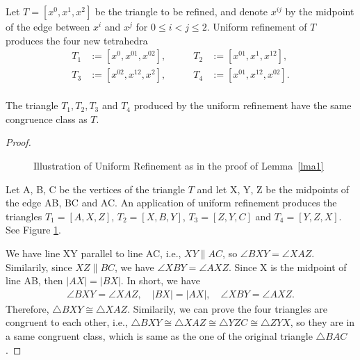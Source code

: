     Let $T = [x^0, x^1, x^2]$ be the triangle to be refined, and denote $x^{ij}$ by the midpoint of the edge between $x^i$ and $x^j$ for $0\leq i < j\leq 2$.
    Uniform refinement of $T$ produces the four new tetrahedra
    \begin{align*}
    T_1 &:= [x^0, x^{01}, x^{02}], & \qquad T_2 &:= [x^{01}, x^{1}, x^{12}],\\
    T_3 &:= [x^{02}, x^{12}, x^2], &\qquad T_4 &:= [x^{01}, x^{12}, x^{02}].\\
    \end{align*}
    



    \begin{lemma}
    The triangle $T_1, T_2, T_3$ and $T_4$ produced by the uniform refinement have the same congruence class as $T$.
    \label{lma1}
    \end{lemma}
    \begin{proof}
    \begin{figure}
    \centering
    \caption{Illustration of Uniform Refinement as in the proof of Lemma~\ref{lma1}}
    \label{Fig4}
    \end{figure}

    Let A, B, C be the vertices of the triangle $T$ and let X, Y, Z be the midpoints of the edge AB, BC and AC. An application of uniform refinement produces the triangles $T_1 = [A, X, Z]$, $T_2 = [X, B, Y]$, $T_3 = [Z, Y, C]$ and $T_4 = [Y, Z, X]$. See Figure \ref{Fig4}.

    We have line XY parallel to line AC, i.e., $XY \parallel AC$, so $\angle{BXY} = \angle{XAZ}$. Similarily, since $XZ\parallel BC$, we have $\angle{XBY} = \angle{AXZ}$. Since X is the midpoint of line AB, then $|AX| = |BX|$. In short, we have 
    \begin{align*}
    \angle{BXY} = \angle{XAZ},
    \quad
    |BX| = |AX|,
    \quad
    \angle{XBY} = \angle{AXZ}.
    \end{align*}
    Therefore, $\triangle{BXY} \cong \triangle{XAZ}$. Similarily, we can prove the four triangles are congruent to each other, i.e., $\triangle{BXY}\cong\triangle{XAZ}\cong\triangle{YZC} \cong\triangle{ZYX}$, so they are in a same congruent class, which is same as the one of the original triangle $\triangle{BAC}$.
    \end{proof}

